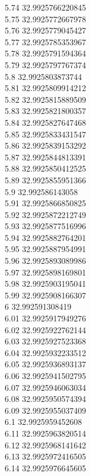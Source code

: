 {5.74	32.9925766220845\\
5.75	32.9925772667978\\
5.76	32.9925779045427\\
5.77	32.9925785353967\\
5.78	32.9925791594364\\
5.79	32.9925797767374\\
5.8	32.9925803873744\\
5.81	32.9925809914212\\
5.82	32.9925815889509\\
5.83	32.9925821800357\\
5.84	32.9925827647468\\
5.85	32.9925833431547\\
5.86	32.9925839153292\\
5.87	32.9925844813391\\
5.88	32.9925850412525\\
5.89	32.9925855951366\\
5.9	32.992586143058\\
5.91	32.9925866850825\\
5.92	32.9925872212749\\
5.93	32.9925877516996\\
5.94	32.9925882764201\\
5.95	32.9925887954991\\
5.96	32.9925893089986\\
5.97	32.9925898169801\\
5.98	32.9925903195041\\
5.99	32.9925908166307\\
6	32.992591308419\\
6.01	32.9925917949276\\
6.02	32.9925922762144\\
6.03	32.9925927523368\\
6.04	32.9925932233512\\
6.05	32.9925936893137\\
6.06	32.9925941502795\\
6.07	32.9925946063034\\
6.08	32.9925950574394\\
6.09	32.9925955037409\\
6.1	32.9925959452608\\
6.11	32.9925963820514\\
6.12	32.9925968141642\\
6.13	32.9925972416505\\
6.14	32.9925976645605\\
}
